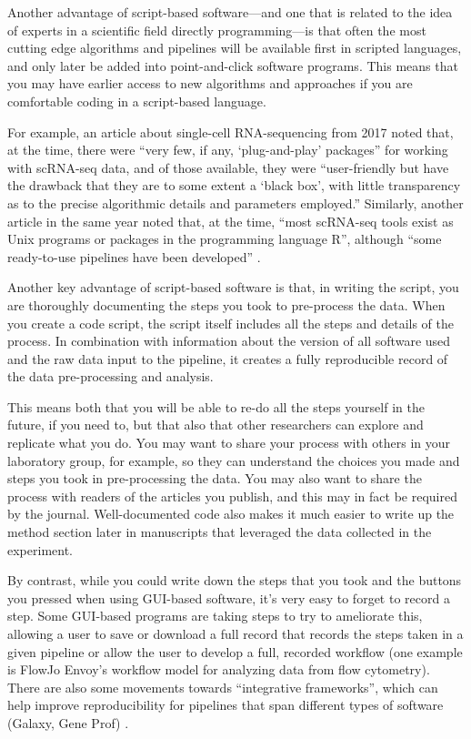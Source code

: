 \documentclass[]{tufte-book}
\begin{document}
Another advantage of script-based software---and one that is related to the idea
of experts in a scientific field directly programming---is that often the most
cutting edge algorithms and pipelines will be available first in scripted
languages, and only later be added into point-and-click software programs. This
means that you may have earlier access to new algorithms and approaches if you
are comfortable coding in a script-based language.

For example, an article about single-cell RNA-sequencing from 2017 noted that,
at the time, there were ``very few, if any, `plug-and-play' packages'' for working
with scRNA-seq data, and of those available, they were ``user-friendly but have
the drawback that they are to some extent a `black box', with little
transparency as to the precise algorithmic details and parameters employed.''
\citep{haque2017practical} Similarly, another article in the same year noted that, at
the time, ``most scRNA-seq tools exist as Unix programs or packages in the
programming language R'', although ``some ready-to-use pipelines have been
developed'' \citep{perkel2017single}.

Another key advantage of script-based software is that, in writing the
script, you are thoroughly documenting the steps you took to pre-process the
data. When you create a code script, the script itself includes all
the steps and details of the process. In combination with information about the
version of all software used and the raw data input to the pipeline, it creates
a fully reproducible record of the data pre-processing and analysis.

This means both that you will be able to re-do all the steps yourself in the
future, if you need to, but that also that other researchers can explore and
replicate what you do. You may want to share your process with others in your
laboratory group, for example, so they can understand the choices you made and
steps you took in pre-processing the data. You may also want to share the
process with readers of the articles you publish, and this may in fact be
required by the journal. Well-documented code also makes it much easier to write
up the method section later in manuscripts that leveraged the data collected in
the experiment.

By contrast, while you could write down the steps that you took and the buttons
you pressed when using GUI-based software, it's very easy to forget to
record a step. Some GUI-based programs are taking steps to try to
ameliorate this, allowing a user to save or download a full record that records
the steps taken in a given pipeline or allow the user to develop a full,
recorded workflow (one example is FlowJo Envoy's workflow model for analyzing
data from flow cytometry). There are also some movements towards
``integrative frameworks'', which can help improve reproducibility for pipelines
that span different types of software (Galaxy, Gene Prof) \citep{nekrutenko2012next}.
\end{document}

